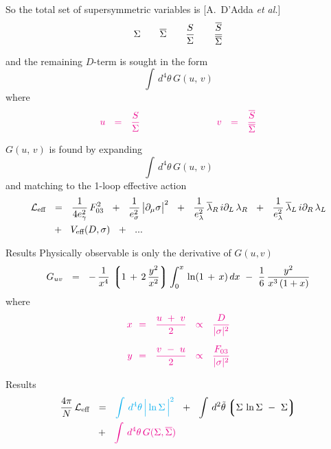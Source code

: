 \documentclass{beamer}
\begin{document}
\begin{frame}

	So the total set of supersymmetric variables is
	[{{\sc A.~D'Adda} {\it et al.}}]
\[
	\Sigma\qquad \overline{\Sigma}\qquad \frac{S}{\Sigma}\qquad \frac{\overline{S}}{\overline \Sigma}
\]

	and the remaining $ D $-term is sought in the form
\[
	\int\, d^4\theta\, G(u,\, v)
\]
	where
\[
\textcolor{magenta}
{
	u    ~~=~~    \frac{S}{\Sigma}
	\qquad\qquad\qquad\qquad
	v    ~~=~~    \frac{\overline S}{\overline \Sigma}
}
\]
\end{frame}


\begin{frame}
	$ G(u,\, v) $ is found by expanding
\[
	\int\, d^4\theta\, G(u,\, v)
\]
	and matching to the 1-loop effective action
\begin{align*}
%
	\mc{L}_\text{eff}  & ~~=~~  
		\frac{1}{4e_\gamma^2}\,F_{03}^2  ~~+~~  \frac{1}{e_\sigma^2}\,\big|\p_\mu\sigma\big|^2
		~~+~~ \frac{1}{e_\lambda^2}\,\ov{\lambda}{}_R\, i\p_L\, \lambda_R
		~~+~~ \frac{1}{e_\lambda^2}\,\ov{\lambda}{}_L\, i\p_R\, \lambda_L
		\\
%
		&
		~~+~~ V_\text{eff}(D, \sigma)
                ~~+~~ ...
\end{align*}
\end{frame}


\begin{frame}{Results}
	Physically observable is only the derivative of $ G(u,v) $
\[
	G_{uv}    ~~=~~    
		-\,\frac{1}{x^4}\,\left\lgroup 1 \,+\, 2\,\frac{y^2}{x^2} \right\rgroup
		\int_0^x\, \ln (1 \,+\, x)\, dx
		~-~ \frac{1}{6}\, \frac{y^2}{x^3\, (1 + x)}
\]
	where
\begin{align*}
	\color{magenta}x    & \color{magenta}{~~=~~    \frac{u ~+~ v}{2}    ~~\propto~~    \frac{D}{|\sigma|^2}}
        \\[2mm]
	\color{magenta}y    & \color{magenta}{~~=~~    \frac{v ~-~ u}{2}    ~~\propto~~    \frac{F_{03}}{|\sigma|^2}}
\end{align*}
\end{frame}


\begin{frame}{Results}
\begin{align*}
%
	\frac{4\pi}{N}\, \cell_\text{eff}    & ~~=~~     
			\textcolor{cyan}{\int\, d^4\theta\, \Big| \ln \Sigma \, \Big|^2}
			~~+~~
			\int\, d^2\tilde\theta 
			\lgr
			\Sigma\, \ln \Sigma  ~-~ \Sigma
			\rgr
	\\
%
	&
	~~+~~ \textcolor{magenta}{\int\, d^4\theta\, G(\Sigma,\ov\Sigma)}
\end{align*}
\end{frame}
\end{document}
